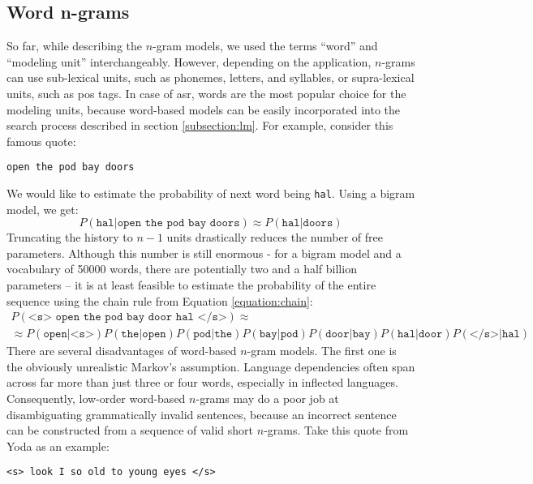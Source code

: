 	\subsection{Word n-grams}
	So far, while describing the $n$-gram models, we used the terms ``word'' and ``modeling unit'' interchangeably. However, depending on the application, $n$-grams can use sub-lexical units, such as phonemes, letters, and syllables, or supra-lexical units, such as \gls{pos} tags. In case of \gls{asr}, words are the most popular choice for the modeling units, because word-based models can be easily incorporated into the search process described in section \ref{subsection:lm}. For example, consider this famous quote:
	\begin{center}
		\texttt{open the pod bay doors}
	\end{center}
	We would like to estimate the probability of next word being \texttt{hal}. Using a bigram model, we get:
	\begin{equation}
		P(\texttt{hal}|\texttt{open the pod bay doors}) \approx P(\texttt{hal}|\texttt{doors})
	\end{equation}
	Truncating the history to $n-1$ units drastically reduces the number of free parameters. Although this number is still enormous - for a bigram model and a vocabulary of 50000 words, there are potentially two and a half billion parameters -- it is at least feasible to estimate the probability of the entire sequence using the chain rule from Equation \ref{equation:chain}:
	\begin{multline}
		P(\texttt{<s> open the pod bay door hal </s>}) \approx \\
		\approx P(\texttt{open}|\texttt{<s>})P(\texttt{the}|\texttt{open})P(\texttt{pod}|\texttt{the})P(\texttt{bay}|\texttt{pod})P(\texttt{door}|\texttt{bay})P(\texttt{hal}|\texttt{door})P(\texttt{</s>}|\texttt{hal})
	\end{multline}
	There are several disadvantages of word-based $n$-gram models. The first one is the obviously unrealistic Markov's assumption. Language dependencies often span across far more than just three or four words, especially in inflected languages. Consequently, low-order word-based $n$-grams may do a poor job at disambiguating grammatically invalid sentences, because an incorrect sentence can be constructed from a sequence of valid short $n$-grams. Take this quote from Yoda as an example:
	\begin{center}
		\texttt{<s> look I so old to young eyes </s>}
	\end{center}
